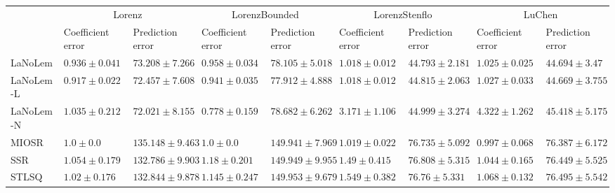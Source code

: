 \begin{table*}
{\begin{tabular}{lllllllll}
 & \multicolumn{2}{c}{Lorenz} & \multicolumn{2}{c}{LorenzBounded} & \multicolumn{2}{c}{LorenzStenflo} & \multicolumn{2}{c}{LuChen} \\
 & Coefficient error & Prediction error & Coefficient error & Prediction error & Coefficient error & Prediction error & Coefficient error & Prediction error \\
\midrule
LaNoLem & $0.936\pm 0.041$ & $73.208\pm 7.266$ & $0.958\pm 0.034$ & $78.105\pm 5.018$ & $\mathbf{1.018}\pm 0.012$ & $\mathbf{44.793}\pm 2.181$ & $1.025\pm 0.025$ & $44.694\pm 3.47$ \\
LaNoLem-L & $\mathbf{0.917}\pm 0.022$ & $72.457\pm 7.608$ & $0.941\pm 0.035$ & $\mathbf{77.912}\pm 4.888$ & $1.018\pm 0.012$ & $44.815\pm 2.063$ & $1.027\pm 0.033$ & $\mathbf{44.669}\pm 3.755$ \\
LaNoLem-N & $1.035\pm 0.212$ & $\mathbf{72.021}\pm 8.155$ & $\mathbf{0.778}\pm 0.159$ & $78.682\pm 6.262$ & $3.171\pm 1.106$ & $44.999\pm 3.274$ & $4.322\pm 1.262$ & $45.418\pm 5.175$ \\
MIOSR & $1.0\pm 0.0$ & $135.148\pm 9.463$ & $1.0\pm 0.0$ & $149.941\pm 7.969$ & $1.019\pm 0.022$ & $76.735\pm 5.092$ & $\mathbf{0.997}\pm 0.068$ & $76.387\pm 6.172$ \\
SSR & $1.054\pm 0.179$ & $132.786\pm 9.903$ & $1.18\pm 0.201$ & $149.949\pm 9.955$ & $1.49\pm 0.415$ & $76.808\pm 5.315$ & $1.044\pm 0.165$ & $76.449\pm 5.525$ \\
STLSQ & $1.02\pm 0.176$ & $132.844\pm 9.878$ & $1.145\pm 0.247$ & $149.953\pm 9.679$ & $1.549\pm 0.382$ & $76.76\pm 5.331$ & $1.068\pm 0.132$ & $76.495\pm 5.542$ \\

\midrule


\end{tabular}}
\end{table*}
